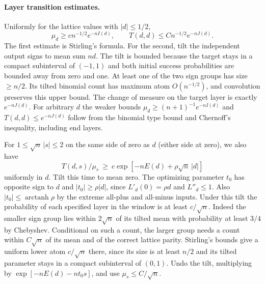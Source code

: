 \paragraph{Layer transition estimates.}
Uniformly for the lattice values with $|d|\le1/2$,
\[
 \mu_d\ge c n^{-1/2}e^{-nI(d)},\qquad T(d,d)\le C n^{-1/2}e^{-nJ(d)} .
\]
The first estimate is Stirling's formula. For the second, tilt the independent output signs to mean sum $nd$. The tilt is bounded because the target stays in a compact subinterval of $(-1,1)$ and both initial success probabilities are bounded away from zero and one. At least one of the two sign groups has size $\ge n/2$. Its tilted binomial count has maximum atom $O(n^{-1/2})$, and convolution preserves this upper bound. The change of measure on the target layer is exactly $e^{-nJ(d)}$. For arbitrary $d$ the weaker bounds $\mu_d\ge(n+1)^{-1}e^{-nI(d)}$ and $T(d,d)\le e^{-nJ(d)}$ follow from the binomial type bound and Chernoff's inequality, including end layers.

For $1\le \sqrt n\,|s|\le2$ on the same side of zero as $d$ (either side at zero), we also have
\begin{equation}\label{lowerrow}
 T(d,s)/\mu_s\ \ge\ c\exp[-nE(d)+\rho\sqrt n\,|d|]
\end{equation}
uniformly in $d$. Tilt this time to mean zero. The optimizing parameter $t_0$ has opposite sign to $d$ and $|t_0|\ge\rho|d|$, since $L'_d(0)=\rho d$ and $L''_d\le1$. Also $|t_0|\le\operatorname{arctanh}\rho$ by the extreme all-plus and all-minus inputs. Under this tilt the probability of each specified layer in the window is at least $c/\sqrt n$. Indeed the smaller sign group lies within $2\sqrt n$ of its tilted mean with probability at least $3/4$ by Chebyshev. Conditional on such a count, the larger group needs a count within $C\sqrt n$ of its mean and of the correct lattice parity. Stirling's bounds give a uniform lower atom $c/\sqrt n$ there, since its size is at least $n/2$ and its tilted parameter stays in a compact subinterval of $(0,1)$. Undo the tilt, multiplying by $\exp[-nE(d)-nt_0s]$, and use $\mu_s\le C/\sqrt n$.


